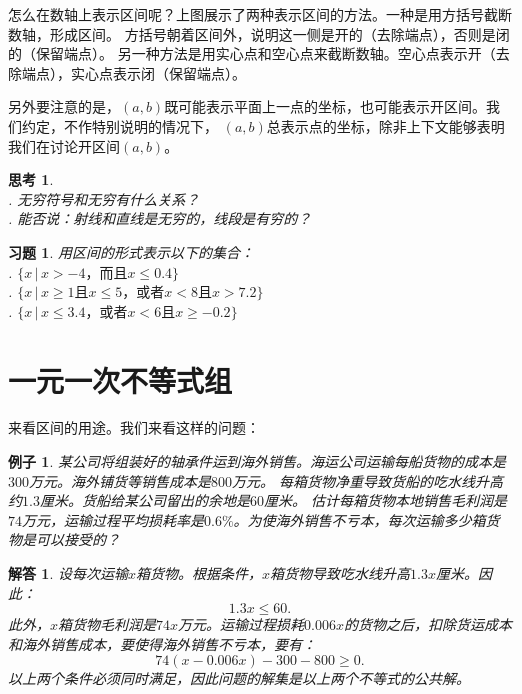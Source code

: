 \documentclass[12pt,UTF8]{ctexbook}
\newtheorem{ex}{例子}[section]
\newtheorem{sk}{思考}[section]
\newtheorem*{so}{解答}
\newtheorem{xt}{习题}[section]
\begin{document}
怎么在数轴上表示区间呢？上图展示了两种表示区间的方法。一种是用方括号截断数轴，形成区间。
方括号朝着区间外，说明这一侧是开的（去除端点），否则是闭的（保留端点）。
另一种方法是用实心点和空心点来截断数轴。空心点表示开（去除端点），实心点表示闭（保留端点）。

另外要注意的是，$(a, b)$既可能表示平面上一点的坐标，也可能表示开区间。我们约定，不作特别说明的情况下，
$(a, b)$总表示点的坐标，除非上下文能够表明我们在讨论开区间$(a, b)$。
\begin{sk}\label{sk:5-4-0}
    \mbox{}\\
    . 无穷符号和无穷有什么关系？\\
    . 能否说：射线和直线是无穷的，线段是有穷的？
\end{sk}
\begin{xt}\label{xt:5-4-0}
    用区间的形式表示以下的集合：\\
    . $\{x \, | \, x > -4 \mbox{，而且} x \leqslant 0.4 \}$ \\
    . $\{x \, | \, x \geqslant 1 \mbox{且} x \leqslant 5 \mbox{，或者} x < 8  \mbox{且} x > 7.2 \}$ \\
    . $\{x \, | \, x \leqslant 3.4 \mbox{，或者} x < 6  \mbox{且} x \geqslant -0.2 \}$
\end{xt}

\section{一元一次不等式组}
来看区间的用途。我们来看这样的问题：
\begin{ex}\label{ex:5-5-0}
    某公司将组装好的轴承件运到海外销售。海运公司运输每船货物的成本是$300$万元。海外铺货等销售成本是$800$万元。
    每箱货物净重导致货船的吃水线升高约$1.3$厘米。货船给某公司留出的余地是$60$厘米。
    估计每箱货物本地销售毛利润是$74$万元，运输过程平均损耗率是$0.6\%$。为使海外销售不亏本，每次运输多少箱货物是可以接受的？
\end{ex}

\begin{so}
    设每次运输$x$箱货物。根据条件，$x$箱货物导致吃水线升高$1.3x$厘米。因此：
    $$ 1.3x \leqslant  60.$$
    此外，$x$箱货物毛利润是$74x$万元。运输过程损耗$0.006x$的货物之后，扣除货运成本和海外销售成本，要使得海外销售不亏本，要有：
    $$ 74 (x - 0.006x) - 300 - 800 \geqslant 0. $$
    以上两个条件必须同时满足，因此问题的解集是以上两个不等式的公共解。
\end{so}
\end{document}

